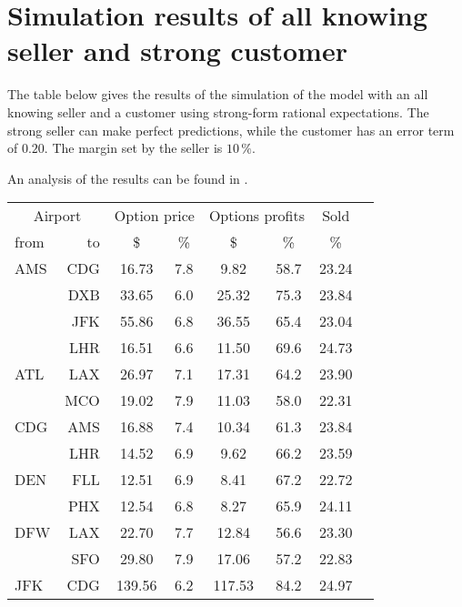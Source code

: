 \chapter{Simulation results of all knowing seller and strong customer}
\label{app:SimulationResultsPerfectStrong}
The table below gives the results of the simulation of the model with an all knowing seller and a customer using strong-form rational expectations. The strong seller can make perfect predictions, while the customer has an error term of $0.20$. The margin set by the seller is $10\,\%$.

An analysis of the results can be found in .
\\[2em]
\begin{table}[h]
    \begin{center}
        \begin{tabular}{l r c c c c c c}
            \toprule
            \multicolumn{2}{c}{Airport}  & \multicolumn{2}{c}{Option price} & \multicolumn{2}{c}{Options profits}  &  Sold  \\[.4ex]
            from  &  to  &  \$  & \%  &  \$  & \%  & \%  \\
            \midrule
AMS  &  CDG &   16.73  &     7.8  &    9.82  &    58.7  &   23.24  \\
     &  DXB &   33.65  &     6.0  &   25.32  &    75.3  &   23.84  \\
     &  JFK &   55.86  &     6.8  &   36.55  &    65.4  &   23.04  \\
     &  LHR &   16.51  &     6.6  &   11.50  &    69.6  &   24.73  \\[.5ex]
ATL  &  LAX &   26.97  &     7.1  &   17.31  &    64.2  &   23.90  \\
     &  MCO &   19.02  &     7.9  &   11.03  &    58.0  &   22.31  \\[.5ex]
CDG  &  AMS &   16.88  &     7.4  &   10.34  &    61.3  &   23.84  \\
     &  LHR &   14.52  &     6.9  &    9.62  &    66.2  &   23.59  \\[.5ex]
DEN  &  FLL &   12.51  &     6.9  &    8.41  &    67.2  &   22.72  \\
     &  PHX &   12.54  &     6.8  &    8.27  &    65.9  &   24.11  \\[.5ex]
DFW  &  LAX &   22.70  &     7.7  &   12.84  &    56.6  &   23.30  \\
     &  SFO &   29.80  &     7.9  &   17.06  &    57.2  &   22.83  \\[.5ex]
JFK  &  CDG &  139.56  &     6.2  &  117.53  &    84.2  &   24.97  \\

\end{tabular}
\end{center}
\end{table}
